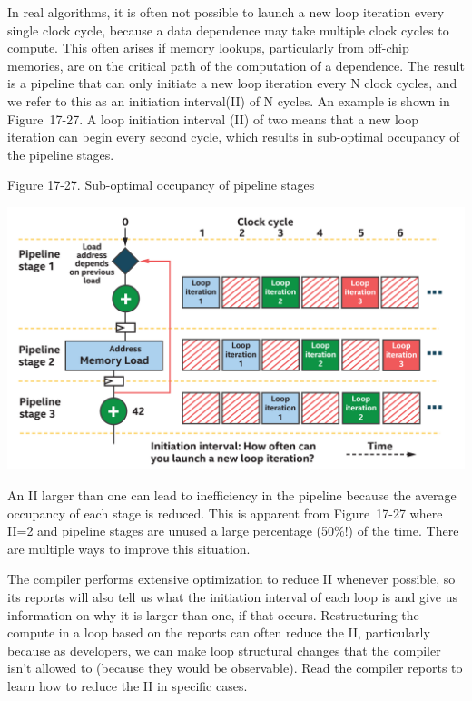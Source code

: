 In real algorithms, it is often not possible to launch a new loop iteration every single clock cycle, because a data dependence may take multiple clock cycles to compute. This often arises if memory lookups, particularly from off-chip memories, are on the critical path of the computation of a dependence. The result is a pipeline that can only initiate a new loop iteration every N clock cycles, and we refer to this as an initiation interval(II) of N cycles. An example is shown in Figure 17-27. A loop initiation interval (II) of two means that a new loop iteration can begin every second cycle, which results in sub-optimal occupancy of the pipeline stages.\par

\hspace*{\fill} \par %
Figure 17-27. Sub-optimal occupancy of pipeline stages
\begin{center}
	\includegraphics[width=1.0\textwidth]{content/chapter-17/images/22}
\end{center}

An II larger than one can lead to inefficiency in the pipeline because the average occupancy of each stage is reduced. This is apparent from Figure 17-27 where II=2 and pipeline stages are unused a large percentage (50\%!) of the time. There are multiple ways to improve this situation.\par

The compiler performs extensive optimization to reduce II whenever possible, so its reports will also tell us what the initiation interval of each loop is and give us information on why it is larger than one, if that occurs. Restructuring the compute in a loop based on the reports can often reduce the II, particularly because as developers, we can make loop structural changes that the compiler isn’t allowed to (because they would be observable). Read the compiler reports to learn how to reduce the II in specific cases.\par

